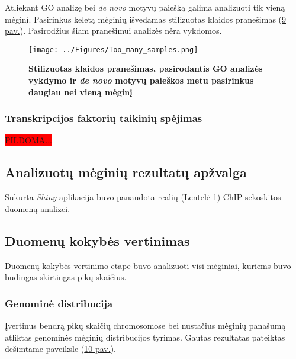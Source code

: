 \documentclass[12pt]{article}
\begin{document}
\newpage

Atliekant GO analizę bei \emph{de novo} motyvų paiešką galima analizuoti tik
vieną mėginį. Pasirinkus keletą mėginių išvedamas stilizuotas klaidos
pranešimas (\hyperref[fig:image9]{9 pav.}). Pasirodžius šiam pranešimui
analizės nėra vykdomos.

\begin{figure}[ht]
    \begin{center}
        \captionsetup{justification=centering}
        \texttt{[image: ../Figures/Too\_many\_samples.png]}
        \vspace{-1.5\baselineskip}
        \caption{\small\textbf{Stilizuotas klaidos pranešimas,
                                pasirodantis GO analizės vykdymo ir
                                \emph{de novo} motyvų paieškos metu pasirinkus
                                daugiau nei vieną mėginį}}
        \label{fig:image9}
    \end{center}
\end{figure}

\newpage

\subsubsection*{Transkripcijos faktorių taikinių spėjimas}
\colorbox{red}{PILDOMA...}

\newpage

\subsection{Analizuotų mėginių rezultatų apžvalga}
Sukurta \emph{Shiny} aplikacija buvo panaudota realių (\hyperref[table:mouse_samples]{Lentelė 1}) ChIP sekoskitos duomenų analizei.

\subsection*{Duomenų kokybės vertinimas}
Duomenų kokybės vertinimo etape buvo analizuoti visi mėginiai, kuriems buvo
būdingas skirtingas pikų skaičius.

\subsubsection*{Genominė distribucija}
Įvertinus bendrą pikų skaičių chromosomose bei nustačius mėginių panašumą
atliktas genominės mėginių distribucijos tyrimas. Gautas rezultatas pateiktas
dešimtame paveiksle (\hyperref[fig:image10]{10 pav.}).
\end{document}
